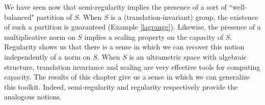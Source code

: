 



We have seen now that semi-regularity implies the presence of a sort of ``well-balanced" partition of $S$. When $S$ is a (translation-invariant) group, the existence of such a partition is guaranteed (Example \ref{lagrange}). Likewise, the presence of a multiplicative norm on $S$ implies a scaling property on the capacity of $S$. Regularity shows us that there is a sense in which we can recover this notion independently of a norm on $S$. When $S$ is an ultrametric space with algebraic structure, translation invariance and scaling are very effective tools for computing capacity. The results of this chapter give us  a sense in which we can generalize this toolkit. Indeed, semi-regularity and regularity respectively provide the analogous notions.








